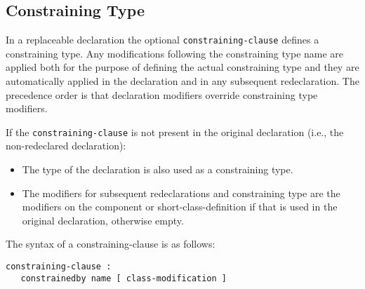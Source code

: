 \subsection{Constraining Type}

In a replaceable declaration the optional \lstinline!constraining-clause! defines a
constraining type. Any modifications following the constraining type
name are applied both for the purpose of defining the actual
constraining type and they are automatically applied in the declaration
and in any subsequent redeclaration. The precedence order is that
declaration modifiers override constraining type modifiers.

If the \lstinline!constraining-clause! is not present in the original declaration
(i.e., the non-redeclared declaration):
\begin{itemize}
\item
  The type of the declaration is also used as a constraining type.
\item
  The modifiers for subsequent redeclarations and constraining type are
  the modifiers on the component or short-class-definition if that is
  used in the original declaration, otherwise empty.
\end{itemize}

The syntax of a constraining-clause is as follows:
\begin{lstlisting}[language=grammar]
constraining-clause :
   constrainedby name [ class-modification ]
\end{lstlisting}

